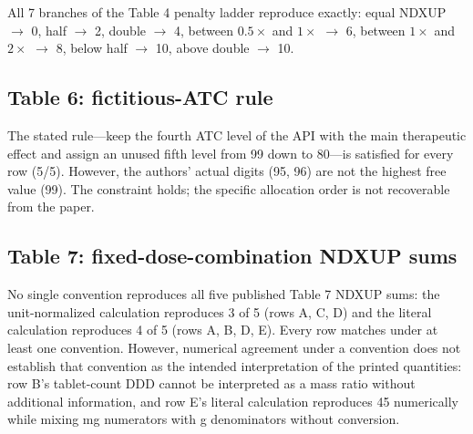 \documentclass[12pt,twocolumn,a4paper]{elsarticle}
\begin{document}
All 7 branches of the Table 4 penalty ladder reproduce exactly: equal NDXUP $\to$ 0, half $\to$ 2, double $\to$ 4, between $0.5\times$ and $1\times$ $\to$ 6, between $1\times$ and $2\times$ $\to$ 8, below half $\to$ 10, above double $\to$ 10.

\subsection{Table 6: fictitious-ATC rule}
\label{sec:results-table6}

The stated rule---keep the fourth ATC level of the API with the main therapeutic effect and assign an unused fifth level from 99 down to 80---is satisfied for every row (5/5). However, the authors' actual digits (95, 96) are not the highest free value (99). The constraint holds; the specific allocation order is not recoverable from the paper.

\subsection{Table 7: fixed-dose-combination NDXUP sums}
\label{sec:results-table7}

\begin{table}[htbp]
\centering\small
\caption{Reproduction of the 5 published Table 7 NDXUP sums under two unit conventions. A row counts as reproduced when \emph{some} convention matches.}
\label{tab:table7}
\end{table}

No single convention reproduces all five published Table 7 NDXUP sums: the unit-normalized calculation reproduces 3 of 5 (rows A, C, D) and the literal calculation reproduces 4 of 5 (rows A, B, D, E). Every row matches under at least one convention. However, numerical agreement under a convention does not establish that convention as the intended interpretation of the printed quantities: row B's tablet-count DDD cannot be interpreted as a mass ratio without additional information, and row E's literal calculation reproduces 45 numerically while mixing mg numerators with g denominators without conversion.
\end{document}
